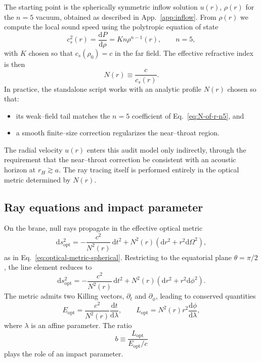 \documentclass[11pt]{article}
\begin{document}
The starting point is the spherically symmetric inflow solution
\(u(r)\), \(\rho(r)\) for the \(n=5\) vacuum, obtained as described in
App.~\ref{app:inflow}.  From \(\rho(r)\) we compute the local sound speed
using the polytropic equation of state
\begin{equation}
  c_s^2(r)
  = \frac{\mathrm{d}P}{\mathrm{d}\rho}
  = K n \rho^{n-1}(r),
  \qquad n = 5,
\end{equation}
with \(K\) chosen so that \(c_s(\rho_0) = c\) in the far field.  The
effective refractive index is then
\begin{equation}
  N(r) \equiv \frac{c}{c_s(r)}.
  \label{eq:N-of-r-full}
\end{equation}
In practice, the standalone script works with an analytic profile
\(N(r)\) chosen so that:
\begin{itemize}
  \item its weak--field tail matches the \(n=5\) coefficient of
        Eq.~\eqref{eq:N-of-r-n5}, and
  \item a smooth finite--size correction regularizes the near--throat region.
\end{itemize}

The radial velocity \(u(r)\) enters this audit model only indirectly,
through the requirement that the near--throat correction be consistent with
an acoustic horizon at \(r_H \gtrsim a\).  The ray tracing itself is
performed entirely in the optical metric determined by \(N(r)\).

\subsection{Ray equations and impact parameter}
\label{app:lensing-ray-eqns}

On the brane, null rays propagate in the effective optical metric
\begin{equation}
  \mathrm{d}s_{\text{opt}}^2
  = -\frac{c^2}{N^2(r)}\,\mathrm{d}t^2
    + N^2(r)
      \left( \mathrm{d}r^2
      + r^2 \mathrm{d}\Omega^2 \right),
\end{equation}
as in Eq.~\eqref{eq:optical-metric-spherical}.  Restricting to the
equatorial plane \(\theta = \pi/2\), the line element reduces to
\begin{equation}
  \mathrm{d}s_{\text{opt}}^2
  = -\frac{c^2}{N^2(r)}\,\mathrm{d}t^2
    + N^2(r)
      \left( \mathrm{d}r^2
      + r^2 \mathrm{d}\phi^2 \right).
\end{equation}
The metric admits two Killing vectors, \(\partial_t\) and \(\partial_{\phi}\),
leading to conserved quantities
\begin{equation}
  E_{\text{opt}}
  = \frac{c^2}{N^2(r)} \frac{\mathrm{d}t}{\mathrm{d}\lambda},
  \qquad
  L_{\text{opt}}
  = N^2(r) r^2 \frac{\mathrm{d}\phi}{\mathrm{d}\lambda},
\end{equation}
where \(\lambda\) is an affine parameter.  The ratio
\begin{equation}
  b \equiv \frac{L_{\text{opt}}}{E_{\text{opt}}/c}
\end{equation}
plays the role of an impact parameter.
\end{document}
